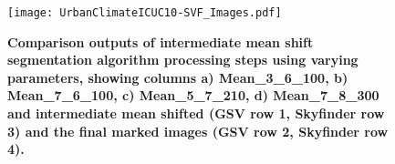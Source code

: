 \documentclass[final,3p,times,authoryear]{elsarticle}
\begin{document}
%


\begin{figure}
\centering 
\texttt{[image: UrbanClimateICUC10-SVF\_Images.pdf]} 
\caption{\bf Comparison outputs of intermediate mean shift segmentation algorithm processing steps using varying parameters, showing columns a) Mean\_3\_6\_100, b) Mean\_7\_6\_100, c) Mean\_5\_7\_210, d) Mean\_7\_8\_300 and intermediate mean shifted (GSV row 1, Skyfinder row 3) and the final marked images (GSV row 2, Skyfinder row 4). }
 \label{fig:meanresults}  
\end{figure} 
\end{document}
